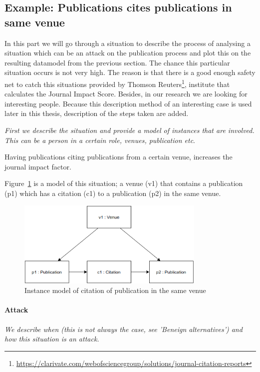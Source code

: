 \documentclass{ou-report}
\begin{document}
\subsection{Example: Publications cites publications in same venue}
\label{interesting_case:publications_cites_publications_in_same_venue}
In this part we will go through a situation to describe the process of analysing
a situation which can be an attack on the publication process and plot this on the
resulting datamodel from the previous section. The chance this 
particular situation occurs is not very high. The reason is that there is a good
enough safety net to catch this situations provided by Thomson Reuters\footnote{\url{https://clarivate.com/webofsciencegroup/solutions/journal-citation-reports}}, 
institute that 
calculates the Journal Impact Score. Besides, in our research we are looking for
interesting people. Because this description method of an interesting case is
used later in this thesis, description of the steps taken are added. 

\textit{First we describe the situation and provide a model of instances that 
are involved. This can be a person in a certain role, venues, publication etc}.

Having publications citing publications from a certain venue, increases the 
journal impact factor.

Figure~\ref{fig:cpsv} is a model of this situation; a venue (v1) that
contains a publication (p1) which has a citation (c1) to a publication (p2) in
the same venue.

\begin{figure}[H]
\centering
\includegraphics[width=9cm]{images/cited_publications_same_journal.drawio.png}
\caption{Instance model of citation of publication in the same venue}
\label{fig:cpsv}
\end{figure}

\paragraph{Attack}
\textit{We describe when (this is not always the case, see 'Beneign 
alternatives') and how this situation is an attack.} 
\end{document}
